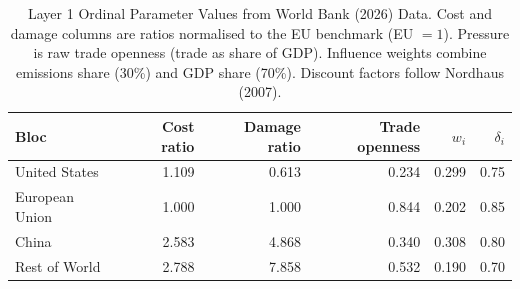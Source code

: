 \begin{table}[htbp]
\centering
\small
\caption{Layer 1 Ordinal Parameter Values from World Bank (2026) Data. Cost and damage columns are ratios normalised to the EU benchmark (EU $= 1$). Pressure is raw trade openness (trade as share of GDP). Influence weights combine emissions share (30\%) and GDP share (70\%). Discount factors follow Nordhaus (2007).}
\label{tab:layer1_params}
\begin{tabular}{lrrrrr}
\toprule
\textbf{Bloc} & \textbf{Cost ratio} & \textbf{Damage ratio} & \textbf{Trade openness} & $w_i$ & $\delta_i$ \\
\midrule
United States  & 1.109 & 0.613 & 0.234 & 0.299 & 0.75 \\
European Union & 1.000 & 1.000 & 0.844 & 0.202 & 0.85 \\
China          & 2.583 & 4.868 & 0.340 & 0.308 & 0.80 \\
Rest of World  & 2.788 & 7.858 & 0.532 & 0.190 & 0.70 \\
\bottomrule
\end{tabular}
\end{table}
